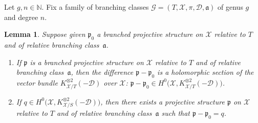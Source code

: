 \documentclass[JEP,XML,SOM,Unicode,NoEqCountersInSection,published]{cedram}
\newcommand{\N}{\mathbb N}
\theoremstyle{definition}
\theoremstyle{plain}
\newtheorem{lemma}[definition]{Lemma}
\begin{document}
Let $g, n \in \N$.
Fix a family of branching classes $\mathcal G = (T, \mathcal X, \pi, \mathcal D, \mathfrak a)$ of genus $g$ and degree $n$.

\begin{lemma}\label{lemma_relative_bps_Schwarzian_derivative}
Suppose given $\mathfrak p_0$ a branched projective structure on $\mathcal X$ relative to $T$ and of relative branching class~$\mathfrak a$.
\begin{enumerate}
\item
If $\mathfrak p$ is a branched projective structure on $\mathcal X$ relative to $T$ and of relative branching class~$\mathfrak a$, then the difference $\mathfrak p-\mathfrak p_0$ is a holomorphic section of the vector bundle $K_{\mathcal X / T}^{\otimes 2}(-\mathcal D)$ over $\mathcal X$: $\mathfrak p-\mathfrak p_0 \in H^0\bigl(\mathcal X, K_{\mathcal X/T}^{\otimes 2}(-\mathcal D)\bigr)$.
\item
If $q \in H^0\bigl(\mathcal X, K_{\mathcal X/S}^{\otimes 2}(-\mathcal D)\bigr)$, then there exists a projective structure $\mathfrak p$ on $\mathcal X$ relative to $T$ and of relative branching class~$\mathfrak a$ such that $\mathfrak p - \mathfrak p_0 = q$.
\end{enumerate}
\end{lemma}
\end{document}
